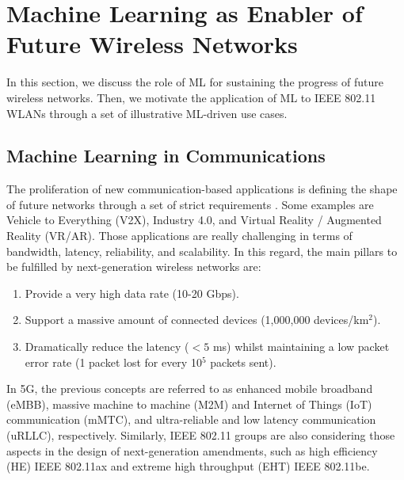 \documentclass[twocolumn]{article}
\begin{document}
\section{Machine Learning as Enabler of Future Wireless Networks} 
\label{section:intro_ML}
In this section, we discuss the role of ML for sustaining the progress of future wireless networks. Then, we motivate the application of ML to IEEE 802.11 WLANs through a set of illustrative ML-driven use cases.

\subsection{Machine Learning in Communications}
The proliferation of new communication-based applications is defining the shape of future networks through a set of strict requirements \cite{itu2019use}. Some examples are Vehicle to Everything (V2X), Industry 4.0, and Virtual Reality / Augmented Reality (VR/AR). Those applications are really challenging in terms of bandwidth, latency, reliability, and scalability. In this regard, the main pillars to be fulfilled by next-generation wireless networks are:
\begin{enumerate}
	\item Provide a very high data rate (10-20 Gbps).
	\item Support a massive amount of connected devices (1,000,000 devices/km$^2$).
	\item Dramatically reduce the latency ($<5$ ms) whilst maintaining a low packet error rate (1 packet lost for every 10$^5$ packets sent).
\end{enumerate}

In 5G, the previous concepts are referred to as enhanced mobile broadband (eMBB), massive machine to machine (M2M) and Internet of Things (IoT) communication (mMTC), and ultra-reliable and low latency communication (uRLLC), respectively. Similarly, IEEE 802.11 groups are also considering those aspects in the design of next-generation amendments, such as high efficiency (HE) IEEE 802.11ax and extreme high throughput (EHT) IEEE 802.11be.
\end{document}
